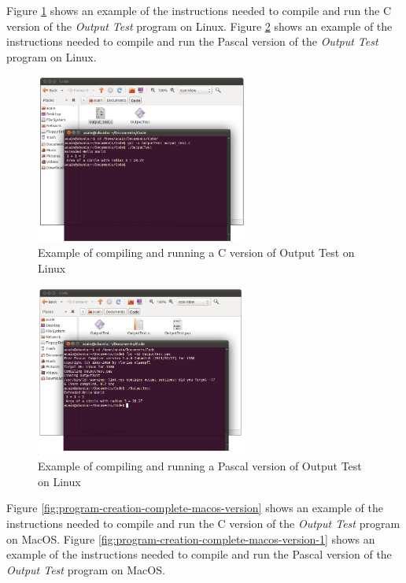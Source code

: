 \clearpage
Figure \ref{fig:program-creation-complete-linux-version} shows an example of the instructions needed to compile and run the C version of the \emph{Output Test} program on Linux. Figure \ref{fig:program-creation-complete-linux-version-1} shows an example of the instructions needed to compile and run the Pascal version of the \emph{Output Test} program on Linux.

\begin{figure}[h]
   \centering
   \includegraphics[width=0.62\textwidth]{./topics/program-creation/images/LinuxCompleteExample1} 
   \caption{Example of compiling and running a C version of Output Test on Linux}
   \label{fig:program-creation-complete-linux-version}
\end{figure}

\begin{figure}[h]
   \centering
   \includegraphics[width=0.62\textwidth]{./topics/program-creation/images/LinuxCompleteExample} 
   \caption{Example of compiling and running a Pascal version of Output Test on Linux}
   \label{fig:program-creation-complete-linux-version-1}
\end{figure}

\clearpage
Figure \ref{fig:program-creation-complete-macos-version} shows an example of the instructions needed to compile and run the C version of the \emph{Output Test} program on MacOS. Figure \ref{fig:program-creation-complete-macos-version-1} shows an example of the instructions needed to compile and run the Pascal version of the \emph{Output Test} program on MacOS.

